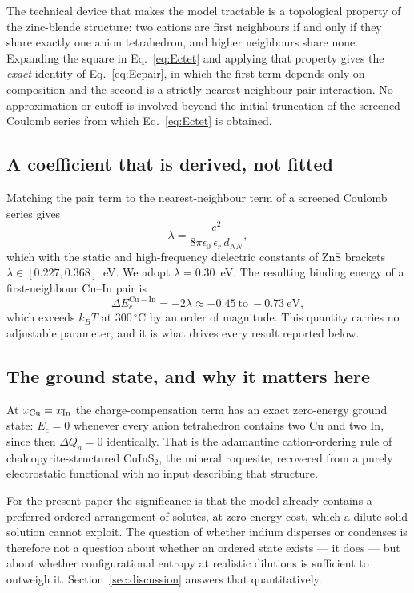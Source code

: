 \documentclass[11pt,a4paper]{article}
\newcommand{\dQ}{\Delta Q}
\begin{document}
The technical device that makes the model tractable is a topological property of
the zinc-blende structure: two cations are first neighbours if and only if they
share exactly one anion tetrahedron, and higher neighbours share none. Expanding
the square in Eq.~\eqref{eq:Ectet} and applying that property gives the
\emph{exact} identity of Eq.~\eqref{eq:Ecpair}, in which the first term depends
only on composition and the second is a strictly nearest-neighbour pair
interaction. No approximation or cutoff is involved beyond the initial
truncation of the screened Coulomb series from which Eq.~\eqref{eq:Ectet} is
obtained.

\subsection{A coefficient that is derived, not fitted}

Matching the pair term to the nearest-neighbour term of a screened Coulomb
series gives
\begin{equation}
\lambda = \frac{e^2}{8\pi\epsilon_0\,\epsilon_r\, d_{NN}},
\label{eq:lambda}
\end{equation}
which with the static and high-frequency dielectric constants of ZnS brackets
$\lambda \in [0.227, 0.368]$~eV. We adopt $\lambda = 0.30$~eV. The resulting
binding energy of a first-neighbour Cu--In pair is
\begin{equation}
\Delta E_c^{\mathrm{Cu-In}} = -2\lambda \approx -0.45 \ \text{to} \ -0.73\ \mathrm{eV},
\label{eq:binding}
\end{equation}
which exceeds $k_BT$ at $300\,^\circ$C by an order of magnitude. This quantity
carries no adjustable parameter, and it is what drives every result reported
below.

\subsection{The ground state, and why it matters here}

At $x_{\rm Cu} = x_{\rm In}$ the charge-compensation term has an exact
zero-energy ground state: $E_c = 0$ whenever every anion tetrahedron contains
two Cu and two In, since then $\dQ_a = 0$ identically. That is the adamantine
cation-ordering rule of chalcopyrite-structured $\mathrm{CuInS_2}$, the mineral
roquesite, recovered from a purely electrostatic functional with no input
describing that structure.

For the present paper the significance is that the model already contains a
preferred ordered arrangement of solutes, at zero energy cost, which a dilute
solid solution cannot exploit. The question of whether indium disperses or
condenses is therefore not a question about whether an ordered state exists ---
it does --- but about whether configurational entropy at realistic dilutions is
sufficient to outweigh it. Section~\ref{sec:discussion} answers that
quantitatively.
\end{document}
